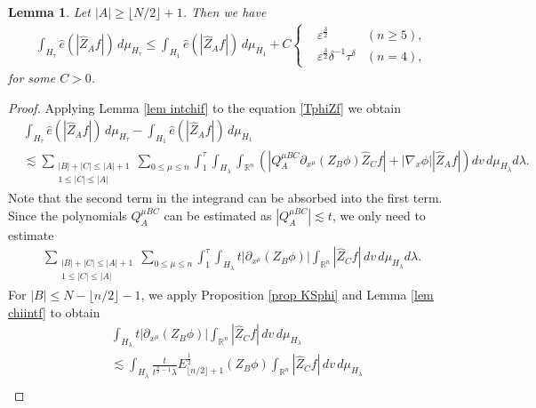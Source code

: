 \documentclass{article}
\newtheorem{lemma}{Lemma}[section]
\newcommand{\bbr}{{\mathbb R}}
\newcommand{\bbrn}{{\bbr^n}}
\begin{document}
%
\begin{lemma} \label{lem intchiZf1}
Let $ | A | \geq \lfloor N / 2 \rfloor + 1 $. Then we have
\begin{align*}
\int_{ H_\tau } \hat{ e } ( | \hat{ Z }_A f | ) \, d \mu_{ H_\tau } \leq \int_{ H_1 } \hat{ e } ( | \hat{ Z }_A f | ) \, d \mu_{ H_1 } + C
\left\{
\begin{aligned}
& \varepsilon^{ \frac32 } & ( n \geq 5 ) , \\
& \varepsilon^{ \frac32 } \delta^{ - 1 } \tau^\delta & ( n = 4 ) , 
\end{aligned}
\right.
\end{align*}
for some $ C > 0 $.
\end{lemma}
\begin{proof}
Applying Lemma \ref{lem intchif} to the equation \eqref{TphiZf} we obtain
\begin{align*}
& \int_{ H_\tau } \hat{ e } ( | \hat{ Z }_A f | ) \, d \mu_{ H_\tau } - \int_{ H_1 } \hat{ e } ( | \hat{ Z }_A f | ) \, d \mu_{ H_1 } \\
& \lesssim \sum_{ \substack{ | B | + | C | \leq | A | + 1 \\ 1 \leq | C | \leq | A | } } \sum_{ 0 \leq \mu \leq n } \int_1^\tau \int_{ H_\lambda } \int_\bbrn \left( | Q^{ \mu B C }_{ A } \partial_{ x^\mu } ( Z_B \phi ) \hat{ Z }_C f | + | \nabla_x \phi | | \hat{ Z }_A f | \right) d v \, d \mu_{ H_\lambda } d \lambda .
\end{align*}
Note that the second term in the integrand can be absorbed into the first term. Since the polynomials $ Q^{ \mu B C }_{ A } $ can be estimated as $ | Q^{ \mu B C }_{ A } | \lesssim t $, we only need to estimate
\begin{align*}
\sum_{ \substack { | B | + | C | \leq | A | + 1 \\ 1 \leq | C | \leq | A | } } \sum_{ 0 \leq \mu \leq n } \int_1^\tau \int_{ H_\lambda } t | \partial_{ x^\mu } ( Z_B \phi ) | \int_\bbrn | \hat{ Z }_C f | \, d v \, d \mu_{ H_\lambda } d \lambda .
\end{align*}
For $ | B | \leq N - \lfloor n / 2 \rfloor - 1 $, we apply Proposition \ref{prop KSphi} and Lemma \ref{lem chiintf} to obtain
\begin{align}
& \int_{ H_\lambda } t | \partial_{ x^\mu } ( Z_B \phi ) | \int_\bbrn | \hat{ Z }_C f | \, d v \,d \mu_{ H_\lambda } \nonumber \\
& \lesssim \int_{ H_\lambda } \frac{ t }{ t^{ \frac{ n }{ 2 } - 1 } \lambda } E_{ \lfloor n / 2 \rfloor +1 }^{ \frac{ 1 }{ 2 } } ( Z_B \phi ) \int_\bbrn | \hat{ Z }_C f | \, d v \, d \mu_{ H_\lambda } \nonumber \\

\end{align}
\end{proof}
\end{document}
